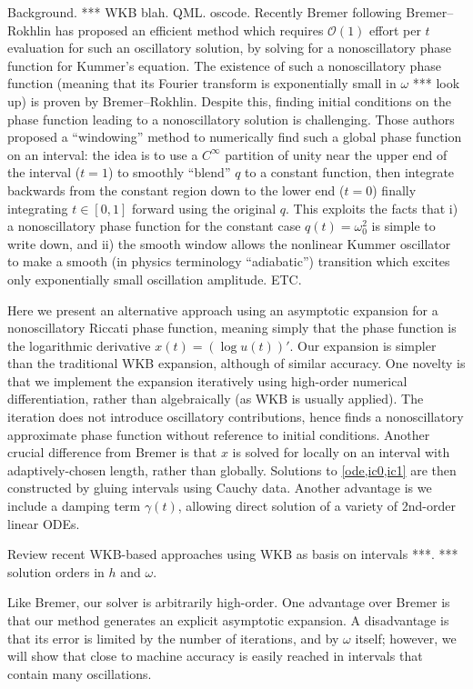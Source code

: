 \documentclass[10pt]{article}
\newcommand{\bigO}{{\mathcal O}}
\newcommand{\om}{\omega}
\newcommand{\g}{\gamma}
\begin{document}
Background. ***
WKB blah.
QML.
oscode.
Recently Bremer following Bremer--Rokhlin has proposed an efficient
method
which requires $\bigO(1)$ effort per $t$ evaluation for such an
oscillatory solution, by solving for a nonoscillatory
phase function for Kummer's equation.
The existence of such a nonoscillatory phase function
(meaning that its Fourier transform is exponentially small in $\om$ ***
look up) is proven by Bremer--Rokhlin.
Despite this, finding initial conditions on the phase function leading to
a nonoscillatory solution is challenging.
Those authors proposed a
``windowing'' method to numerically find such a global phase function
on an interval:
the idea is to use a $C^\infty$ partition of unity near the upper end of the interval ($t=1$) to smoothly ``blend'' $q$ to
a constant function, then integrate backwards from the constant region
down to the lower end ($t=0$)
finally integrating $t\in[0,1]$ forward using the original $q$.
This exploits the facts that i) a nonoscillatory phase function for
the constant case $q(t) = \om_0^2$ is simple to write down, and
ii) the smooth window allows
the nonlinear Kummer oscillator to make a smooth (in physics
terminology ``adiabatic'') transition which excites
only exponentially small oscillation amplitude.
ETC.

Here we present an alternative approach using
an asymptotic expansion for a nonoscillatory
Riccati phase function, meaning simply that the
phase function is the logarithmic derivative $x(t) = (\log u(t))'$.
Our expansion is simpler than the traditional WKB expansion,
although of similar accuracy.
One novelty is that we
implement the expansion iteratively
using high-order numerical differentiation, rather
than algebraically (as WKB is usually applied).
The iteration does not introduce oscillatory contributions,
hence finds a nonoscillatory approximate phase function without
reference to initial conditions.
Another crucial difference from Bremer is that $x$ is solved for
locally on an interval with adaptively-chosen length, rather than
globally.
Solutions to \cref{ode,ic0,ic1} are then constructed by
gluing intervals using Cauchy data.
Another advantage is we include a damping term $\g(t)$,
allowing direct
solution of a variety of 2nd-order linear ODEs.

Review recent WKB-based approaches using WKB as basis on intervals ***.
*** solution orders in $h$ and $\om$.

Like Bremer, our solver is arbitrarily high-order.
One advantage over Bremer is that our method generates an explicit asymptotic
expansion. A disadvantage is that its error is limited by the number
of iterations, and by $\omega$ itself; however,
we will show that close to machine accuracy is easily reached in
intervals that contain many oscillations.
\end{document}
